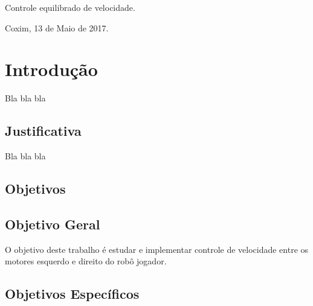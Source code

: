 \documentclass[a4paper,12pt,portuguese]{ufms-cpcx}
\begin{document}
\begin{center}
	
	\begin{minipage}[t]{10cm}
		\begin{center}
			\vspace{-2cm}
			{{\Large Controle equilibrado de velocidade.}}  
		\end{center}
	\end{minipage}
	
\end{center}

\vskip 3.0cm 

\begin{flushright}
	\vspace{12cm}
	Coxim, 13 de Maio de 2017.
\end{flushright}









\chapter{Introdução}
Bla bla bla
 
 
 \section{Justificativa}  
 Bla bla bla


 \section{Objetivos}
 
 
 \section{Objetivo Geral}  
  
 O objetivo deste trabalho é estudar e implementar controle de velocidade entre os motores esquerdo e direito do robô jogador. 

\section{Objetivos Específicos}
\end{document}
